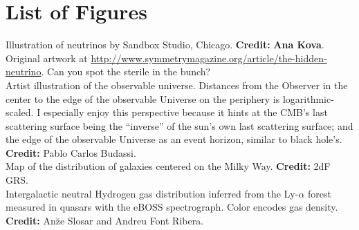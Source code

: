 \chapter*{List of Figures}
{\color{purple}\titlerule[2.5pt]}
\vspace{4pc}%

\vspace{0.2cm}
\hspace{0.6cm}
Illustration of neutrinos by \textsf{Sandbox Studio}, Chicago. \textbf{Credit:} \textbf{Ana Kova}. Original artwork at \url{http://www.symmetrymagazine.org/article/the-hidden-neutrino}. Can you spot the sterile in the bunch? \\
\vspace{0.2cm}
\hspace{0.6cm}
Artist illustration of the observable universe. Distances from the Observer in the center to the edge of the observable Universe on the periphery is logarithmic-scaled. I especially enjoy this perspective because it hints at the CMB's last scattering surface being the ``inverse'' of the sun's own last scattering surface; and the edge of the observable Universe as an event horizon, similar to black hole's. \textbf{Credit:} Pablo Carlos Budassi. \\

\vspace{0.2cm}
\hspace{0.6cm}
Map of the distribution of galaxies centered on the Milky Way. \textbf{Credit:} 2dF GRS. \\

\vspace{0.2cm}
\hspace{0.6cm}
Intergalactic neutral Hydrogen gas distribution inferred from the Ly-$\alpha$ forest measured in quasars with the eBOSS spectrograph. Color encodes gas density. \textbf{Credit:} An\u{z}e Slosar and Andreu Font Ribera. \\


